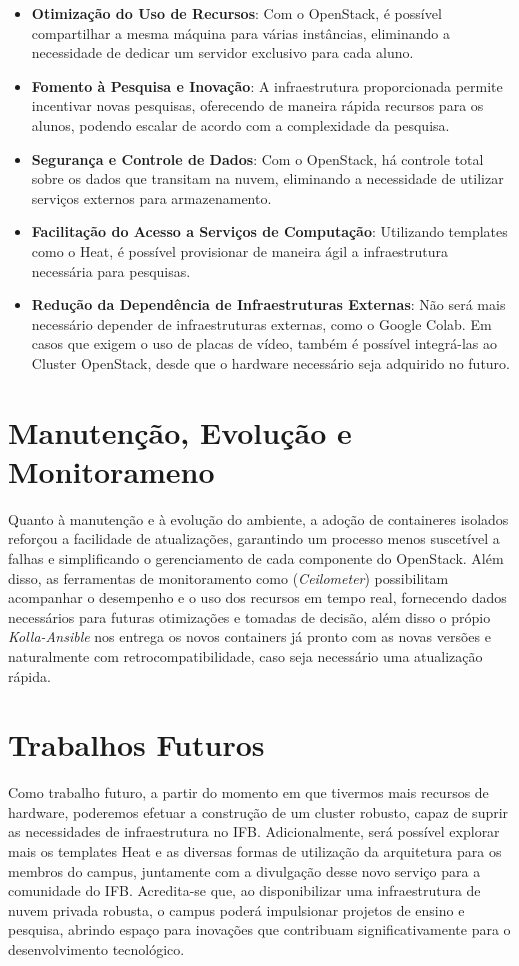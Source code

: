 \begin{itemize}
    \item \textbf{Otimização do Uso de Recursos}: Com o OpenStack, é possível compartilhar a mesma máquina para várias instâncias, eliminando a necessidade de dedicar um servidor exclusivo para cada aluno.
    \item \textbf{Fomento à Pesquisa e Inovação}: A infraestrutura proporcionada permite incentivar novas pesquisas, oferecendo de maneira rápida recursos para os alunos, podendo escalar de acordo com a complexidade da pesquisa.
    \item \textbf{Segurança e Controle de Dados}: Com o OpenStack, há controle total sobre os dados que transitam na nuvem, eliminando a necessidade de utilizar serviços externos para armazenamento.
    \item \textbf{Facilitação do Acesso a Serviços de Computação}: Utilizando templates como o Heat, é possível provisionar de maneira ágil a infraestrutura necessária para pesquisas.
    \item \textbf{Redução da Dependência de Infraestruturas Externas}: Não será mais necessário depender de infraestruturas externas, como o Google Colab. Em casos que exigem o uso de placas de vídeo, também é possível integrá-las ao Cluster OpenStack, desde que o hardware necessário seja adquirido no futuro.
\end{itemize}


\section{Manutenção, Evolução e Monitorameno}
Quanto à manutenção e à evolução do ambiente, a adoção de containeres isolados reforçou a facilidade de atualizações, garantindo um processo menos suscetível a falhas e simplificando o gerenciamento de cada componente do OpenStack. Além disso, as ferramentas de monitoramento como (\textit{Ceilometer}) possibilitam acompanhar o desempenho e o uso dos recursos em tempo real, fornecendo dados necessários para futuras otimizações e tomadas de decisão, além disso o própio \textit{Kolla-Ansible} nos entrega os novos containers já pronto com as novas versões e naturalmente com retrocompatibilidade, caso seja necessário uma atualização rápida.


\section{Trabalhos Futuros}
Como trabalho futuro, a partir do momento em que tivermos mais recursos de hardware, poderemos efetuar a construção de um cluster robusto, capaz de suprir as necessidades de infraestrutura no IFB. Adicionalmente, será possível explorar mais os templates Heat e as diversas formas de utilização da arquitetura para os membros do campus, juntamente com a divulgação desse novo serviço para a comunidade do IFB. Acredita-se que, ao disponibilizar uma infraestrutura de nuvem privada robusta, o campus poderá impulsionar projetos de ensino e pesquisa, abrindo espaço para inovações que contribuam significativamente para o desenvolvimento tecnológico.